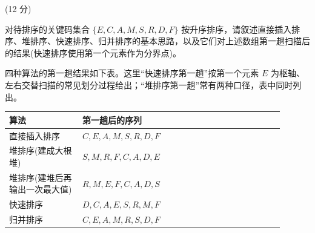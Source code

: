 \begin{question}[排序算法](12 分)

对待排序的关键码集合 $\{E,C,A,M,S,R,D,F\}$ 按升序排序，请叙述直接插入排序、堆排序、快速排序、归并排序的基本思路，以及它们对上述数组第一趟扫描后的结果(快速排序使用第一个元素作为分界点)。

\begin{solution}
四种算法的第一趟结果如下表。这里“快速排序第一趟”按第一个元素 $E$ 为枢轴、左右交替扫描的常见划分过程给出；“堆排序第一趟”常有两种口径，表中同时列出。
\begin{center}
\begin{tabular}{@{}p{0.24\linewidth} p{0.66\linewidth}@{}}
\toprule
算法 & 第一趟后的序列 \\
\midrule
直接插入排序 & $C,E,A,M,S,R,D,F$ \\
堆排序(建成大根堆) & $S,M,R,F,C,A,D,E$ \\
堆排序(建堆后再输出一次最大值) & $R,M,E,F,C,A,D,S$ \\
快速排序 & $D,C,A,E,S,R,M,F$ \\
归并排序 & $C,E,A,M,R,S,D,F$ \\
\bottomrule
\end{tabular}
\end{center}
\end{solution}
\end{question}

